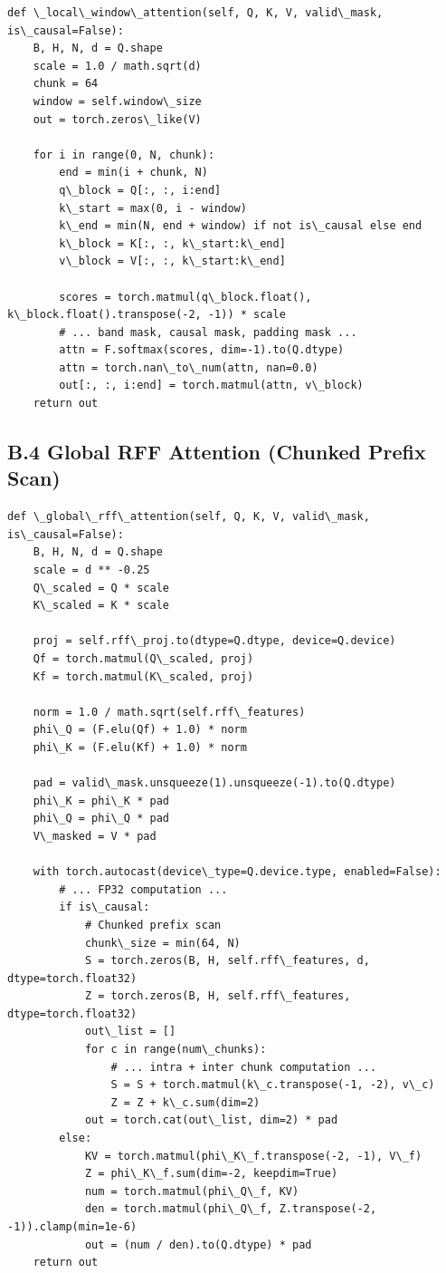 \begin{lstlisting}
def \_local\_window\_attention(self, Q, K, V, valid\_mask, is\_causal=False):
    B, H, N, d = Q.shape
    scale = 1.0 / math.sqrt(d)
    chunk = 64
    window = self.window\_size
    out = torch.zeros\_like(V)
    
    for i in range(0, N, chunk):
        end = min(i + chunk, N)
        q\_block = Q[:, :, i:end]
        k\_start = max(0, i - window)
        k\_end = min(N, end + window) if not is\_causal else end
        k\_block = K[:, :, k\_start:k\_end]
        v\_block = V[:, :, k\_start:k\_end]
        
        scores = torch.matmul(q\_block.float(), k\_block.float().transpose(-2, -1)) * scale
        # ... band mask, causal mask, padding mask ...
        attn = F.softmax(scores, dim=-1).to(Q.dtype)
        attn = torch.nan\_to\_num(attn, nan=0.0)
        out[:, :, i:end] = torch.matmul(attn, v\_block)
    return out
\end{lstlisting}

\subsection{B.4 Global RFF Attention (Chunked Prefix Scan)}

\begin{lstlisting}
def \_global\_rff\_attention(self, Q, K, V, valid\_mask, is\_causal=False):
    B, H, N, d = Q.shape
    scale = d ** -0.25
    Q\_scaled = Q * scale
    K\_scaled = K * scale
    
    proj = self.rff\_proj.to(dtype=Q.dtype, device=Q.device)
    Qf = torch.matmul(Q\_scaled, proj)
    Kf = torch.matmul(K\_scaled, proj)
    
    norm = 1.0 / math.sqrt(self.rff\_features)
    phi\_Q = (F.elu(Qf) + 1.0) * norm
    phi\_K = (F.elu(Kf) + 1.0) * norm
    
    pad = valid\_mask.unsqueeze(1).unsqueeze(-1).to(Q.dtype)
    phi\_K = phi\_K * pad
    phi\_Q = phi\_Q * pad
    V\_masked = V * pad
    
    with torch.autocast(device\_type=Q.device.type, enabled=False):
        # ... FP32 computation ...
        if is\_causal:
            # Chunked prefix scan
            chunk\_size = min(64, N)
            S = torch.zeros(B, H, self.rff\_features, d, dtype=torch.float32)
            Z = torch.zeros(B, H, self.rff\_features, dtype=torch.float32)
            out\_list = []
            for c in range(num\_chunks):
                # ... intra + inter chunk computation ...
                S = S + torch.matmul(k\_c.transpose(-1, -2), v\_c)
                Z = Z + k\_c.sum(dim=2)
            out = torch.cat(out\_list, dim=2) * pad
        else:
            KV = torch.matmul(phi\_K\_f.transpose(-2, -1), V\_f)
            Z = phi\_K\_f.sum(dim=-2, keepdim=True)
            num = torch.matmul(phi\_Q\_f, KV)
            den = torch.matmul(phi\_Q\_f, Z.transpose(-2, -1)).clamp(min=1e-6)
            out = (num / den).to(Q.dtype) * pad
    return out
\end{lstlisting}

